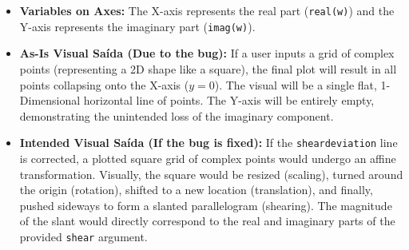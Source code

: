 \begin{itemize}
    \item \textbf{Variables on Axes:} The X-axis represents the real part (\texttt{real(w)}) and the Y-axis represents the imaginary part (\texttt{imag(w)}).
    
    \item \textbf{As-Is Visual Saída (Due to the bug):} 
    If a user inputs a grid of complex points (representing a 2D shape like a square), the final plot will result in all points collapsing onto the X-axis ($y=0$). The visual will be a single flat, 1-Dimensional horizontal line of points. The Y-axis will be entirely empty, demonstrating the unintended loss of the imaginary component.

    \item \textbf{Intended Visual Saída (If the bug is fixed):}
    If the \texttt{sheardeviation} line is corrected, a plotted square grid of complex points would undergo an affine transformation. Visually, the square would be resized (scaling), turned around the origin (rotation), shifted to a new location (translation), and finally, pushed sideways to form a slanted parallelogram (shearing). The magnitude of the slant would directly correspond to the real and imaginary parts of the provided \texttt{shear} argument.
\end{itemize}

